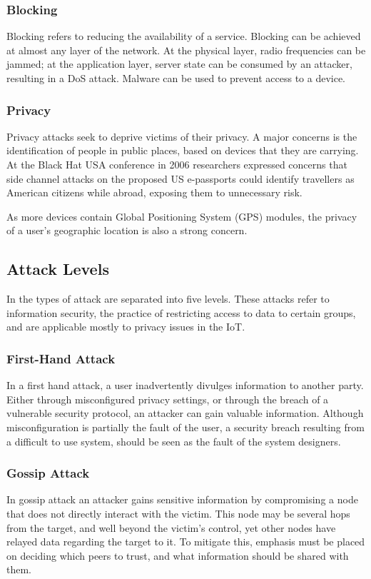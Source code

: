 \documentclass[10pt,journal,compsoc]{IEEEtran}
\begin{document}
\subsubsection{Blocking}
Blocking refers to reducing the availability of a service. Blocking can be
achieved at almost any layer of the network. At the physical layer, radio
frequencies can be jammed; at the application layer, server state can be
consumed by an attacker, resulting in a DoS attack. Malware can be used to
prevent access to a device.

\subsubsection{Privacy}
Privacy attacks seek to deprive victims of their privacy. A major concerns is
the identification of people in public places, based on devices that they are
carrying. At the Black Hat USA conference in 2006 \cite{Flexilis2006}
researchers expressed concerns that side channel attacks on the proposed US
e-passports could identify travellers as American citizens while abroad,
exposing them to unnecessary risk.

As more devices contain Global Positioning System (GPS) modules, the privacy of
a user's geographic location is also a strong concern.

\subsection{Attack Levels}
In \cite{Elkhodr2013} the types of attack are separated into five levels. These
attacks refer to information security, the practice of restricting access to
data to certain groups, and are applicable mostly to privacy issues in the IoT.

\subsubsection{First-Hand Attack}
In a first hand attack, a user inadvertently divulges information to another
party. Either through misconfigured privacy settings, or through the breach of
a vulnerable security protocol, an attacker can gain valuable information.
Although misconfiguration is partially the fault of the user, a security breach
resulting from a difficult to use system, should be seen as the fault of the
system designers. 

\subsubsection{Gossip Attack}
In gossip attack an attacker gains sensitive information by compromising a node
that does not directly interact with the victim. This node may be several hops
from the target, and well beyond the victim's control, yet other nodes have
relayed data regarding the target to it. To mitigate this, emphasis must be
placed on deciding which peers to trust, and what information should be shared
with them.
\end{document}
